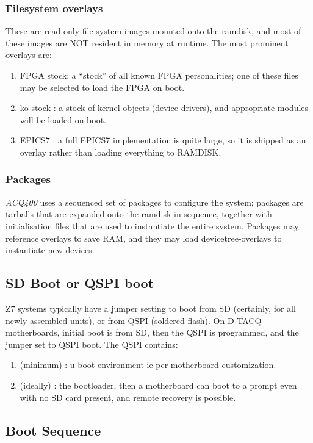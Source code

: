 \documentclass[]{article}
\newcommand{\glossy}[1]{{\color{blue}\itshape #1}}
\begin{document}
\subsubsection{Filesystem overlays}
These are read-only file system images mounted onto the ramdisk, and most of these images are NOT resident in memory at runtime. The most prominent overlays are:
\begin{enumerate}
    \item FPGA stock: a “stock” of all known FPGA personalities; one of these files may be selected to load the FPGA on boot.
    \item ko stock : a stock of kernel objects (device drivers), and appropriate modules will be loaded on boot.
    \item EPICS7 : a full EPICS7 implementation is quite large, so it is shipped as an overlay rather than loading everything to RAMDISK.
\end{enumerate}

\subsubsection{Packages}
\glossy{ACQ400} uses a sequenced set of packages to configure the system; packages are tarballs that are expanded onto the ramdisk in sequence, together with initialisation files that are used to instantiate the entire system. Packages may reference overlays to save RAM, and they may load devicetree-overlays to instantiate new devices.

\subsection{SD Boot or QSPI boot}
Z7 systems typically have a jumper setting to boot from SD (certainly, for all newly assembled units), or from QSPI (soldered flash). On D-TACQ motherboards, initial boot is from SD, then the QSPI is programmed, and the jumper set to QSPI boot.
The QSPI contains:
\begin{enumerate}
    \item (minimum) : u-boot environment ie per-motherboard customization.
    \item (ideally) : the bootloader, then a motherboard can boot to a prompt even with no SD card present, and remote recovery is possible.
\end{enumerate}

\subsection{Boot Sequence}
\end{document}
